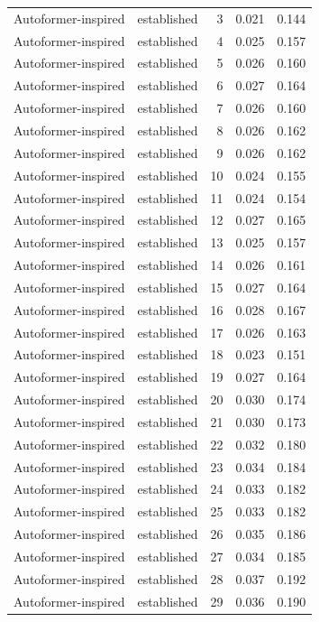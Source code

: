 \begin{tabular}{llrrr}
Autoformer-inspired & established & 3 & 0.021 & 0.144 \\
Autoformer-inspired & established & 4 & 0.025 & 0.157 \\
Autoformer-inspired & established & 5 & 0.026 & 0.160 \\
Autoformer-inspired & established & 6 & 0.027 & 0.164 \\
Autoformer-inspired & established & 7 & 0.026 & 0.160 \\
Autoformer-inspired & established & 8 & 0.026 & 0.162 \\
Autoformer-inspired & established & 9 & 0.026 & 0.162 \\
Autoformer-inspired & established & 10 & 0.024 & 0.155 \\
Autoformer-inspired & established & 11 & 0.024 & 0.154 \\
Autoformer-inspired & established & 12 & 0.027 & 0.165 \\
Autoformer-inspired & established & 13 & 0.025 & 0.157 \\
Autoformer-inspired & established & 14 & 0.026 & 0.161 \\
Autoformer-inspired & established & 15 & 0.027 & 0.164 \\
Autoformer-inspired & established & 16 & 0.028 & 0.167 \\
Autoformer-inspired & established & 17 & 0.026 & 0.163 \\
Autoformer-inspired & established & 18 & 0.023 & 0.151 \\
Autoformer-inspired & established & 19 & 0.027 & 0.164 \\
Autoformer-inspired & established & 20 & 0.030 & 0.174 \\
Autoformer-inspired & established & 21 & 0.030 & 0.173 \\
Autoformer-inspired & established & 22 & 0.032 & 0.180 \\
Autoformer-inspired & established & 23 & 0.034 & 0.184 \\
Autoformer-inspired & established & 24 & 0.033 & 0.182 \\
Autoformer-inspired & established & 25 & 0.033 & 0.182 \\
Autoformer-inspired & established & 26 & 0.035 & 0.186 \\
Autoformer-inspired & established & 27 & 0.034 & 0.185 \\
Autoformer-inspired & established & 28 & 0.037 & 0.192 \\
Autoformer-inspired & established & 29 & 0.036 & 0.190 \\

\end{tabular}
